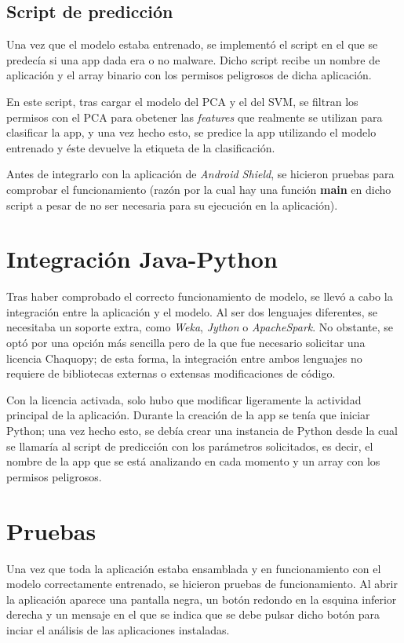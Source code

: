 \subsection{Script de predicción}

Una vez que el modelo estaba entrenado, se implementó el script en el que se predecía si una app dada era o no malware. Dicho script recibe un nombre de aplicación y el array binario con los permisos peligrosos de dicha aplicación.

En este script, tras cargar el modelo del PCA y el del SVM, se filtran los permisos con el PCA para obetener las \textit{features} que realmente se utilizan para clasificar la app, y una vez hecho esto, se predice la app utilizando el modelo entrenado y éste devuelve la etiqueta de la clasificación.

Antes de integrarlo con la aplicación de \textit{Android Shield}, se hicieron pruebas para comprobar el funcionamiento (razón por la cual hay una función \textbf{main} en dicho script a pesar de no ser necesaria para su ejecución en la aplicación).

\section{Integración Java-Python}

Tras haber comprobado el correcto funcionamiento de modelo, se llevó a cabo la integración entre la aplicación y el modelo. Al ser dos lenguajes diferentes, se necesitaba un soporte extra, como \textit{Weka}, \textit{Jython} o \textit{ApacheSpark}. No obstante, se optó por una opción más sencilla pero de la que fue necesario solicitar una licencia Chaquopy; de esta forma, la integración entre ambos lenguajes no requiere de bibliotecas externas o extensas modificaciones de código.

Con la licencia activada, solo hubo que modificar ligeramente la actividad principal de la aplicación. Durante la creación de la app se tenía que iniciar Python; una vez hecho esto, se debía crear una instancia de Python desde la cual se llamaría al script de predicción con los parámetros solicitados, es decir, el nombre de la app que se está analizando en cada momento y un array con los permisos peligrosos. 

\section{Pruebas}

Una vez que toda la aplicación estaba ensamblada y en funcionamiento con el modelo correctamente entrenado, se hicieron pruebas de funcionamiento. Al abrir la aplicación aparece una pantalla negra, un botón redondo en la esquina inferior derecha y un mensaje en el que se indica que se debe pulsar dicho botón para inciar el análisis de las aplicaciones instaladas.

